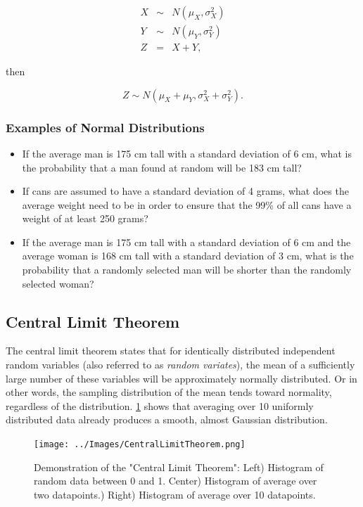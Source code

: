 \begin{eqnarray*}
    X &\sim& N(\mu_X, \sigma_X^2) \\
    Y &\sim& N(\mu_Y, \sigma_Y^2) \\
    Z &=& X + Y,
\end{eqnarray*}

then

\begin{equation}\label{eq:sumOfGaussians}
    Z \sim N(\mu_X + \mu_Y, \sigma_X^2 + \sigma_Y^2).
\end{equation}

\subsubsection{Examples of Normal Distributions}

\begin{itemize}
    \item If the average man is 175 cm tall with a standard deviation of 6 cm, what is the probability that a man found at random will be 183 cm tall?
    \item If cans are assumed to have a standard deviation of 4 grams, what does the average weight need to be in order to ensure that the 99\% of all cans have a weight of at least 250 grams?
   \item If the average man is 175 cm tall with a standard deviation of 6 cm and the average woman is 168 cm tall with a standard deviation of 3 cm, what is the probability that a randomly selected man will be shorter than the randomly selected woman?
\end{itemize}

\subsection{Central Limit Theorem}\label{sec:CentralLimitTheorem}
The central limit theorem states that for identically distributed independent random variables (also referred to as \emph{random variates}), the mean of a sufficiently large number of these variables will be approximately normally distributed. Or in other words, the sampling distribution of the mean tends toward normality, regardless of the distribution.
\ref{fig:CentralLimitTheorem} shows that averaging over 10 uniformly distributed data already produces a smooth, almost Gaussian distribution.

\begin{figure}
  \centering
  \texttt{[image: ../Images/CentralLimitTheorem.png]}\\
  \caption{Demonstration of the "Central Limit Theorem": Left) Histogram of random data between 0 and 1. Center) Histogram of average over two datapoints.) Right) Histogram of average over 10 datapoints.}\label{fig:CentralLimitTheorem}
\end{figure}

